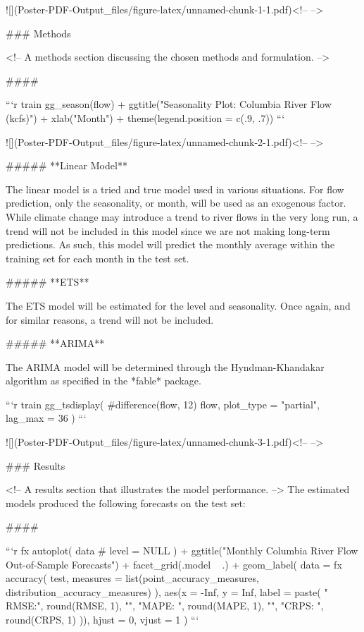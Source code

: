 \documentclass[
]{article}
\begin{document}
\begin{multicols}{4}
![](Poster-PDF-Output_files/figure-latex/unnamed-chunk-1-1.pdf)<!-- --> 



\columnbreak

### Methods

<!-- A methods section discussing the chosen methods and formulation.  -->

#### 


```r
train %
  gg_season(flow) +
  ggtitle("Seasonality Plot: Columbia River Flow (kcfs)") +
  xlab("Month") +
  theme(legend.position = c(.9, .7))
```

![](Poster-PDF-Output_files/figure-latex/unnamed-chunk-2-1.pdf)<!-- --> 


##### **Linear Model**

The linear model is a tried and true model used in various situations. For flow prediction, only the seasonality, or month, will be used as an exogenous factor. While climate change may introduce a trend to river flows in the very long run, a trend will not be included in this model since we are not making long-term predictions. As such, this model will predict the monthly average within the training set for each month in the test set.

##### **ETS**

The ETS model will be estimated for the level and seasonality. Once again, and for similar reasons, a trend will not be included. 

##### **ARIMA**

The ARIMA model will be determined through the Hyndman-Khandakar algorithm as specified in the *fable* package. 


```r
train %
  gg_tsdisplay(
    #difference(flow, 12) %
    flow,
    plot_type = "partial", lag_max = 36
  )
```

![](Poster-PDF-Output_files/figure-latex/unnamed-chunk-3-1.pdf)<!-- --> 


\columnbreak

### Results

<!-- A results section that illustrates the model performance.  -->
The estimated models produced the following forecasts on the test set:

####


```r
fx %
  autoplot(
    data %
    # level = NULL
  ) +
  ggtitle("Monthly Columbia River Flow Out-of-Sample Forecasts") +
  facet_grid(.model ~ .) +
  geom_label(
    data = fx %
      accuracy(
        test, 
        measures = list(point_accuracy_measures, distribution_accuracy_measures)
      ),
    aes(x = -Inf, y = Inf, label = paste(
      " RMSE:", round(RMSE, 1),
      "\n", "MAPE: ", round(MAPE, 1),
      "\n", "CRPS: ", round(CRPS, 1)
    )),
    hjust = 0, vjust = 1
  )
```


\end{multicols}
\end{document}
